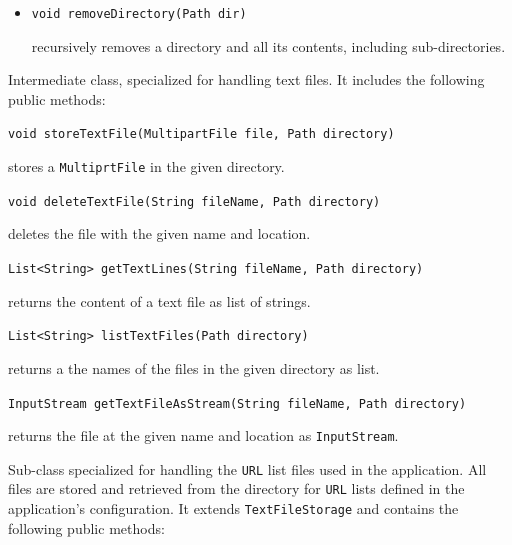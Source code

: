\documentclass[a4paper]{usiinfbachelorproject}
\begin{document}
\begin{description}
\begin{itemize}
                \item \texttt{void removeDirectory(Path dir)}

                    recursively removes a directory and all its contents, including sub-directories.



            \end{itemize}


        \item[TextFileStorage] Intermediate class, specialized for handling text files. It includes the following public methods:

            \begin{description}

                \item \texttt{void storeTextFile(MultipartFile file, Path directory)}

                    stores a \texttt{MultiprtFile} in the given directory.

                \item \texttt{void deleteTextFile(String fileName, Path directory)}

                    deletes the file with the given name and location.

                \item \texttt{List<String> getTextLines(String fileName, Path directory)}

                    returns the content of a text file as list of strings.

                \item \texttt{List<String> listTextFiles(Path directory)}

                    returns a the names of the files in the given directory as list.

                \item \texttt{InputStream getTextFileAsStream(String fileName, Path directory)}

                    returns the file at the given name and location as \texttt{InputStream}.

            \end{description}

        \item[UrlListStorage] Sub-class specialized for handling the \texttt{URL} list files used in the application.
                        All files are stored and retrieved from the directory for \texttt{URL} lists defined in the application's configuration.
                        It extends \texttt{TextFileStorage} and contains the following public methods:


\end{description}
\end{document}
